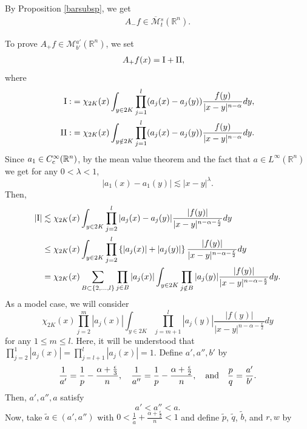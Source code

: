 \documentclass[11pt,a4]{article}
\numberwithin{equation}{section}
\theoremstyle{definition}
\theoremstyle{remark}
\begin{document}
By Proposition \ref{barsubsp}, we get 
\begin{align*}
	A_-f \in \overline{{\mathcal M}}{}^s_t({\mathbb R}^n).
\end{align*}






To prove $A_+f \in {\mathcal M}{}^{a'}_{b'}({\mathbb R}^n)$, we set
\begin{align*}
	A_+f(x)&={\rm I}+{\rm II},
\end{align*}
where
\begin{align*}
	{\rm I}:&=\chi_{2K}(x)\int_{y \in 2K} \prod_{j=1}^l(a_j(x)-a_j(y))\frac{f(y)}{|x-y|^{n-\alpha}}dy,\\
	{\rm II}:&=\chi_{2K}(x)\int_{y \notin 2K} \prod_{j=1}^l(a_j(x)-a_j(y))\frac{f(y)}{|x-y|^{n-\alpha}}dy.
\end{align*}
Since $a_1 \in C^\infty_{\rm c}({\mathbb R}^n)$, by the mean value theorem and the fact that $a \in L^{\infty}({\mathbb R}^n)$ we get for any $0<\lambda<1$,
\[
	|a_1(x)-a_1(y)| \lesssim |x-y|^{\lambda}.
\]
Then, 
\begin{align*}
	|{\rm I}|&\lesssim \chi_{2K}(x)\int_{y \in 2K} \prod_{j=2}^l|a_j(x)-a_j(y)|\frac{|f(y)|}{|x-y|^{n-\alpha-\frac{\epsilon}{2}}}dy\\
	&\le \chi_{2K}(x)\int_{y \in 2K} \prod_{j=2}^l \left\{|a_j(x)|+|a_j(y)|\right\}\frac{|f(y)|}{|x-y|^{n-\alpha-\frac{\epsilon}{2}}}dy\\
	&= \chi_{2K}(x) \sum_{B \subset \{2,...,l\}}\prod_{j \in B}|a_j(x)| \int_{y \in 2K} \prod_{j \notin B}|a_j(y)|\frac{|f(y)|}{|x-y|^{n-\alpha-\frac{\epsilon}{2}}}dy.
\end{align*}
As a model case, we will consider
\[
	\chi_{2K}(x) \prod_{j=2}^m|a_j(x)| \int_{y \in 2K} \prod_{j=m+1}^l|a_j(y)|\frac{|f(y)|}{|x-y|^{n-\alpha-\frac{\epsilon}{2}}}dy
\]
 for any $1 \le m \le l$. Here, it will be understood that $\prod_{j=2}^{1}|a_j(x)|=\prod_{j=l+1}^{l}|a_j(x)|=1$. 
Define $a',a'',b'$ by 
\begin{align*}
	\frac{1}{a'}=\frac{1}{p}-\frac{\alpha+\frac{\epsilon}{3}}{n},\quad \frac{1}{a''}=\frac{1}{p}-\frac{\alpha+\frac{\epsilon}{2}}{n}, \quad {\rm and} \quad  \frac{p}{q}=\frac{a'}{b'}.
\end{align*}
Then, $a', a'', a$ satisfy
\[
	a' < a'' < a.
\]
Now, take $\tilde{a} \in (a',a'')$ with $0 < \frac{1}{\tilde{a}}+\frac{\alpha+\frac{\epsilon}{2}}{n} < 1$ and define $\tilde{p}$, $\tilde{q}$, $\tilde{b}$, and $r, w$ by
\end{document}
